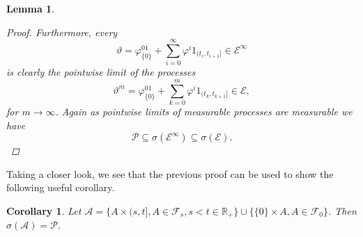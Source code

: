 \documentclass[11pt,a4paper,twoside,openany]{report}
\numberwithin{equation}{section}
\theoremstyle{plain} %
\newtheorem{lemma}[theorem]{Lemma}
\newtheorem{corollary}[theorem]{Corollary}
\theoremstyle{definition} %
\theoremstyle{remark} %
\begin{document}
\begin{lemma}
\begin{proof}
 Furthermore, every 
 \begin{equation}\label{eq:approximating adapted left-continuous processes 2}
     \vartheta=\varphi^01_{\{0\}}+\sum_{i= 0}^\infty \varphi^i1_{(t_i,t_{i+1}]}\in\mathcal{E}^{\infty}
 \end{equation}
 is clearly the pointwise limit of the processes
        \begin{equation*}\label{eq:approximating approximating-sequence of adapted left-continuous processes}
            \vartheta^{m}=\varphi^01_{\{0\}}+\sum_{k=0}^m\varphi^{i}1_{(t_k,t_{k+1}]}\in\mathcal{E},
        \end{equation*}
        for \(m\to\infty\).
        Again as pointwise limits of measurable processes are measurable we have
        \begin{equation*}
        \mathcal{P}\subseteq\sigma(\mathcal{E}^{\infty})\subseteq\sigma(\mathcal{E}).
        \end{equation*}
        \end{proof}
\end{lemma}
Taking a closer look, we see that the previous proof can be used to show the following useful corollary.
\begin{corollary}
    Let \(\mathcal{A}=\{A\times(s,t], A\in\mathcal{F}_s, s<t\in\mathbb{R}_+\}\cup \{\{0\}\times A, A\in\mathcal{F}_0\}\). Then \(\sigma(\mathcal{A})=\mathcal{P}\).
\end{corollary}
\end{document}
